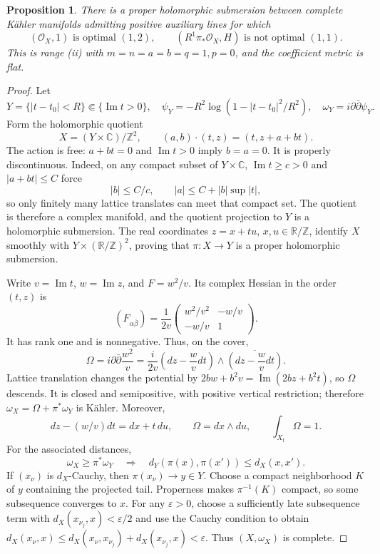 \documentclass[11pt,reqno]{amsart}
\numberwithin{equation}{section}
\newtheorem{proposition}[theorem]{Proposition}
\theoremstyle{definition}
\theoremstyle{remark}
\newcommand{\OO}{\mathcal O}
\newcommand{\ddbar}{\partial\bar\partial}
\begin{document}
\begin{proposition}\label{prop:counter-ii}\label{sec:counter-ii}
There is a proper holomorphic submersion between complete K\"ahler
manifolds admitting positive auxiliary lines for which
\[
 (\OO_X,1)\text{ is optimal }(1,2),\qquad
 (R^1\pi_*\OO_X,H)\text{ is not optimal }(1,1).
\]
This is range (ii) with $m=n=a=b=q=1,p=0$, and the coefficient
metric is flat.
\end{proposition}
\begin{proof}
Let
\[
 Y=\{|t-t_0|<R\}\Subset\{\operatorname{Im}t>0\},\quad
 \psi_Y=-R^2\log(1-|t-t_0|^2/R^2),\quad\omega_Y=i\ddbar\psi_Y.
\]
Form the holomorphic quotient
\[
 X=(Y\times\mathbb C)/\mathbb Z^2,\qquad
 (a,b)\cdot(t,z)=(t,z+a+bt).
\]
The action is free: $a+bt=0$ and $\operatorname{Im}t>0$ imply
$b=a=0$.  It is properly discontinuous.  Indeed, on any compact
subset of $Y\times\mathbb C$, $\operatorname{Im}t\ge c>0$ and
$|a+bt|\le C$ force
\[
 |b|\le C/c,\qquad |a|\le C+|b|\sup|t|,
\]
so only finitely many lattice translates can meet that compact set.
The quotient is therefore a complex manifold, and the quotient
projection to $Y$ is a holomorphic submersion.
The real coordinates $z=x+tu$, $x,u\in\mathbb R/\mathbb Z$, identify
$X$ smoothly with $Y\times(\mathbb R/\mathbb Z)^2$, proving that
$\pi:X\to Y$ is a proper holomorphic submersion.

Write $v=\operatorname{Im}t$, $w=\operatorname{Im}z$, and $F=w^2/v$.
Its complex Hessian in the order $(t,z)$ is
\[
 (F_{\alpha\bar\beta})
 =\frac1{2v}\begin{pmatrix}w^2/v^2&-w/v\\-w/v&1\end{pmatrix}.
\]
It has rank one and is nonnegative.  Thus, on the cover,
\begin{equation}\label{eq:elliptic-form}
 \Omega=i\ddbar\frac{w^2}{v}
 =\frac{i}{2v}\left(dz-\frac{w}{v}dt\right)
              \wedge\overline{\left(dz-\frac{w}{v}dt\right)}.
\end{equation}
Lattice translation changes the potential by
$2bw+b^2v=\operatorname{Im}(2bz+b^2t)$, so $\Omega$ descends.
It is closed and semipositive, with positive vertical restriction;
therefore $\omega_X=\Omega+\pi^*\omega_Y$ is K\"ahler.  Moreover,
\[
 dz-(w/v)dt=dx+t\,du,\qquad\Omega=dx\wedge du,
 \qquad\int_{X_t}\Omega=1.
\]
For the associated distances,
\[
 \omega_X\ge\pi^*\omega_Y
 \quad\Longrightarrow\quad
 d_Y(\pi(x),\pi(x'))\le d_X(x,x').
\]
If $(x_\nu)$ is $d_X$-Cauchy, then $\pi(x_\nu)\to y\in Y$.
Choose a compact neighborhood $K$ of $y$ containing the projected
tail.  Properness makes $\pi^{-1}(K)$ compact, so some subsequence
converges to $x$.  For any $\varepsilon>0$, choose a sufficiently
late subsequence term with $d_X(x_{\nu_j},x)<\varepsilon/2$ and
use the Cauchy condition to obtain
$d_X(x_\nu,x)\le d_X(x_\nu,x_{\nu_j})+d_X(x_{\nu_j},x)<\varepsilon$.
Thus $(X,\omega_X)$ is complete.


\end{proof}
\end{document}
